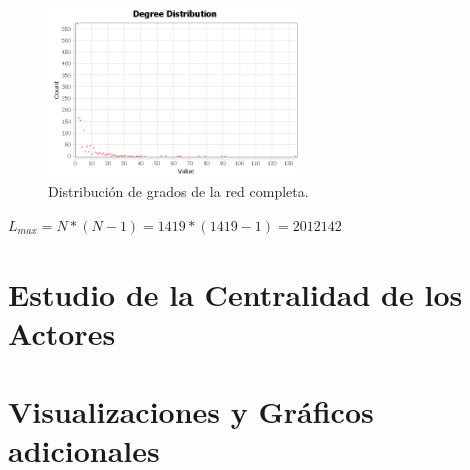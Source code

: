 \documentclass{uimppracticas}
\begin{document}
\begin{figure}[h]
	\centering
	\includegraphics[width=0.6\textwidth]{images/degree-distribution}
	\caption{Distribución de grados de la red completa.}
	\label{degree-distribution}
\end{figure}

\begin{center}
	$L_{max} = N * (N-1) = 1419 * (1419 - 1) = 2012142$
\end{center}

\section*{Estudio de la Centralidad de los Actores}

\section*{Visualizaciones y Gráficos adicionales}

%
%

\newpage

\renewcommand{\refname}{Bibliografía}


\end{document}
